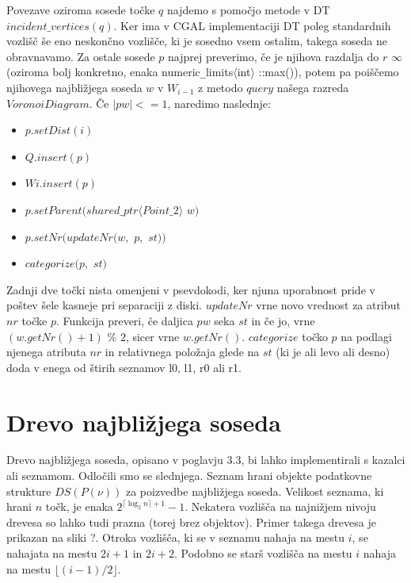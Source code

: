 \documentclass[a4paper, 12pt]{book}
\begin{document}
Povezave oziroma sosede točke $q$ najdemo s pomočjo metode v DT \\ $incident\texttt{\_}vertices(q)$. Ker ima v CGAL implementaciji DT poleg standardnih vozlišč še eno neskončno vozlišče, ki je sosedno vsem ostalim, takega soseda ne obravnavamo. Za ostale sosede $p$ najprej preverimo, če je njihova razdalja do $r$ $\infty$ (oziroma bolj konkretno, enaka numeric\texttt{\_}limits$\langle$int$\rangle$ ::max()), potem pa poiščemo njihovega najbližjega soseda $w$ v $W_{i-1}$ z metodo $query$ našega razreda $VoronoiDiagram$. Če $|pw| <= 1$, naredimo naslednje:

\begin{itemize}
\item $p.setDist(i)$
\item $Q.insert(p)$
\item $Wi.insert(p)$
\item $p.setParent(shared\texttt{\_}ptr\langle Point\texttt{\_}2\rangle  $ $w)$
\item $p.setNr(updateNr(w,$ $p,$ $st))$
\item $categorize(p,$ $st)$
\end{itemize}

Zadnji dve točki nista omenjeni v psevdokodi, ker njuna uporabnost pride v poštev šele kasneje pri separaciji z diski. $updateNr$ vrne novo vrednost za atribut $nr$ točke $p$. Funkcija preveri, če daljica $pw$ seka $st$ in če jo, vrne $(w.getNr() + 1)$ $\%$ $2$, sicer vrne $w.getNr()$. $categorize$ točko $p$ na podlagi njenega atributa $nr$ in relativnega položaja glede na $st$ (ki je ali levo ali desno) doda v enega od štirih seznamov l0, l1, r0 ali r1.

\section{Drevo najbližjega soseda}

Drevo najbližjega soseda, opisano v poglavju 3.3, bi lahko implementirali s kazalci ali seznamom. Odločili smo se slednjega. Seznam hrani objekte podatkovne strukture $DS(P(\nu))$ za poizvedbe najbližjega soseda. Velikost seznama, ki hrani $n$ točk, je enaka $2^{\lceil \log_2n \rceil+1}-1$. Nekatera vozlišča na najnižjem nivoju drevesa so lahko tudi prazna (torej brez objektov). Primer takega drevesa je prikazan na sliki ?. Otroka vozlišča, ki se v seznamu nahaja na mestu $i$, se nahajata na mestu $2i+1$ in $2i+2$. Podobno se starš vozlišča na mestu $i$ nahaja na mestu $\lfloor(i-1)/2\rfloor$.
\end{document}
